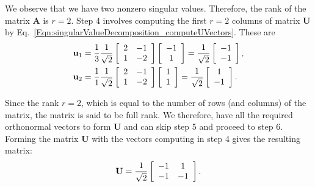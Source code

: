 We observe that we have two nonzero singular values. Therefore, the rank of the matrix $\mathbf{A}$ is $r = 2$. Step 4 involves computing the first $r = 2$ columns of matrix $\mathbf{U}$ by Eq.~\eqref{Eqn:singularValueDecomposition_computeUVectors}. These are
\begin{subequations}
\begin{align}
  \mathbf{u}_1 &= \frac{1}{3} \frac{1}{\sqrt{2}} 
  \left[ \begin{array}{c c}
   2 & -1 \\
   1 & -2 \\ \end{array} \right] 
  \left[ \begin{array}{c} -1 \\ 1 \\ \end{array} \right] =
  \frac{1}{ \sqrt{2} } \left[ \begin{array}{c} -1 \\ -1 \\ \end{array} \right] , \\
  \mathbf{u}_2 &= \frac{1}{1} \frac{1}{\sqrt{2}} 
  \left[ \begin{array}{c c}
   2 & -1 \\
   1 & -2 \\ \end{array} \right] 
  \left[ \begin{array}{c} 1 \\ 1 \\ \end{array} \right] =
  \frac{1}{ \sqrt{2} } \left[ \begin{array}{c}  1 \\ -1 \\ \end{array} \right] .
\end{align}
\end{subequations}

Since the rank $r = 2$, which is equal to the number of rows (and columns) of the matrix, the matrix is said to be full rank. We therefore, have all the required orthonormal vectors to form $\mathbf{U}$ and can skip step 5 and proceed to step 6. Forming the matrix $\mathbf{U}$ with the vectors computing in step 4 gives the resulting matrix:
\begin{align}
  \mathbf{U} = \frac{1}{\sqrt{2}}    \left[ \begin{array}{c c}
   -1 &  1 	\\
   -1 & -1 	\\ \end{array} \right] .
\end{align}


